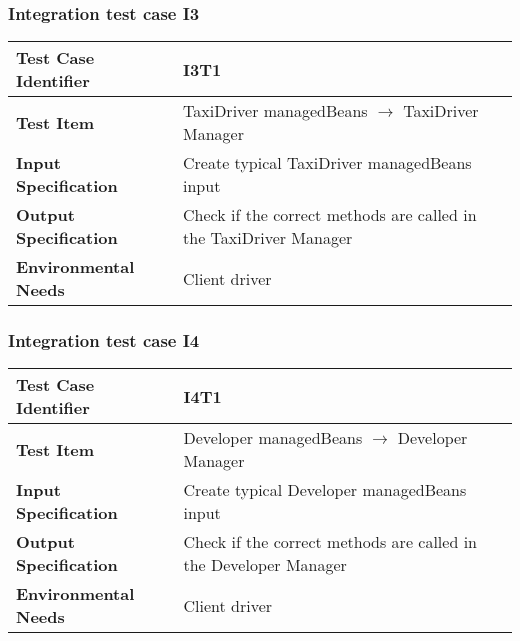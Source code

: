 \subsubsection{Integration test case I3}

\begin{table}[!htbp]
\begin{center}
\begin{tabular}[t]{p{}p{}}

\hline
\textbf{Test Case Identifier} & I3T1 \\
\hline
\textbf{Test Item} & TaxiDriver managedBeans $\rightarrow$ TaxiDriver Manager \\
\hline
\textbf{Input Specification} & Create typical TaxiDriver managedBeans input  \\
\hline
\textbf{Output Specification} & Check if the correct methods are called in the TaxiDriver Manager \\
\hline
\textbf{Environmental Needs} & Client driver \\
\hline

\end{tabular}
\end{center}
\end{table}

\subsubsection{Integration test case I4}

\begin{table}[!htbp]
\begin{center}
\begin{tabular}[t]{p{}p{}}

\hline
\textbf{Test Case Identifier} & I4T1 \\
\hline
\textbf{Test Item} & Developer managedBeans $\rightarrow$ Developer Manager \\
\hline
\textbf{Input Specification} & Create typical Developer managedBeans input  \\
\hline
\textbf{Output Specification} & Check if the correct methods are called in the Developer Manager \\
\hline
\textbf{Environmental Needs} & Client driver \\
\hline

\end{tabular}
\end{center}
\end{table}
\clearpage


